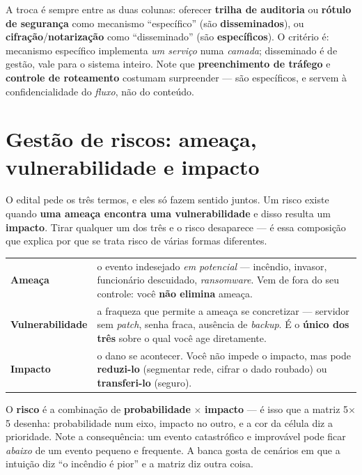 \begin{pegadinha}
A troca é sempre entre as duas colunas: oferecer \textbf{trilha de auditoria}
ou \textbf{rótulo de segurança} como mecanismo ``específico'' (são
\textbf{disseminados}), ou \textbf{cifração}/\textbf{notarização} como
``disseminado'' (são \textbf{específicos}). O critério é: mecanismo específico
implementa \emph{um serviço} numa \emph{camada}; disseminado é de gestão, vale
para o sistema inteiro. Note que \textbf{preenchimento de tráfego} e
\textbf{controle de roteamento} costumam surpreender --- são específicos, e
servem à confidencialidade do \emph{fluxo}, não do conteúdo.
\end{pegadinha}

\section{Gestão de riscos: ameaça, vulnerabilidade e impacto}

O edital pede os três termos, e eles só fazem sentido juntos. Um risco existe
quando \textbf{uma ameaça encontra uma vulnerabilidade} e disso resulta um
\textbf{impacto}. Tirar qualquer um dos três e o risco desaparece --- é essa
composição que explica por que se trata risco de várias formas diferentes.

\begin{conceito}
\begin{center}
\begin{tabular}{@{}p{3cm}p{9cm}@{}}
\toprule
\textbf{Ameaça} & o evento indesejado \emph{em potencial} --- incêndio, invasor, funcionário descuidado, \emph{ransomware}. Vem de fora do seu controle: você \textbf{não elimina} ameaça. \\
\textbf{Vulnerabilidade} & a fraqueza que permite a ameaça se concretizar --- servidor sem \emph{patch}, senha fraca, ausência de \emph{backup}. É o \textbf{único dos três} sobre o qual você age diretamente. \\
\textbf{Impacto} & o dano se acontecer. Você não impede o impacto, mas pode \textbf{reduzi-lo} (segmentar rede, cifrar o dado roubado) ou \textbf{transferi-lo} (seguro). \\
\bottomrule
\end{tabular}
\end{center}

O \textbf{risco} é a combinação de \textbf{probabilidade} $\times$
\textbf{impacto} --- é isso que a matriz 5$\times$5 desenha: probabilidade num
eixo, impacto no outro, e a cor da célula diz a prioridade. Note a
consequência: um evento catastrófico e improvável pode ficar \emph{abaixo} de
um evento pequeno e frequente. A banca gosta de cenários em que a intuição
diz ``o incêndio é pior'' e a matriz diz outra coisa.
\end{conceito}

